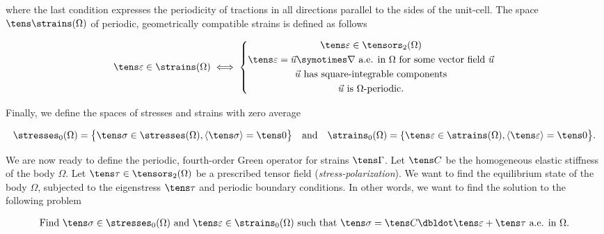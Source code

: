 \documentclass[oneside]{memoir}
\begin{document}
where the last condition expresses the periodicity of tractions in all directions parallel to the sides of the unit-cell. The space \(\tens\strains(\Omega)\) of periodic, geometrically compatible strains is defined as follows



\begin{equation*}
\begin{split}\tens\varepsilon\in\strains(\Omega)\iff\left\{
\begin{gathered}
\tens\varepsilon\in\tensors_2(\Omega)\\
\tens\varepsilon=\vec u\symotimes\nabla
\text{ a.e. in }\Omega\text{ for some vector field }\vec u\\
\vec u\text{ has square-integrable components}\\
\vec u\text{ is }\Omega\text{-periodic.}
\end{gathered}
\right.\end{split}\end{equation*}


Finally, we define the spaces of stresses and strains with zero average



\begin{equation*}
\begin{split}\stresses_0(\Omega)=\bigl\{\tens\sigma\in\stresses(\Omega),
\langle\tens\sigma\rangle=\tens0\bigr\}
\quad\text{and}\quad
\strains_0(\Omega)=\{\tens\varepsilon\in\strains(\Omega),
\langle\tens\varepsilon\rangle=\tens0\bigr\}.\end{split}\end{equation*}


We are now ready to define the periodic, fourth-order Green operator for strains \(\tens\Gamma\). Let \(\tens C\) be the homogeneous elastic stiffness of the body \(\Omega\)\footnotemark[1]. Let \(\tens\tau\in\tensors_2(\Omega)\) be a prescribed tensor field (\emph{stress-polarization}). We want to find the equilibrium state of the body \(\Omega\), subjected to the eigenstress \(\tens\tau\) and periodic boundary conditions. In other words, we want to find the solution to the following problem



\begin{equation*}
\begin{split}\text{Find }\tens\sigma\in\stresses_0(\Omega)
\text{ and }\tens\varepsilon\in\strains_0(\Omega)
\text{ such that }\tens\sigma=\tens C\dbldot\tens\varepsilon+\tens\tau
\text{ a.e. in }\Omega.\end{split}\end{equation*}
\end{document}
